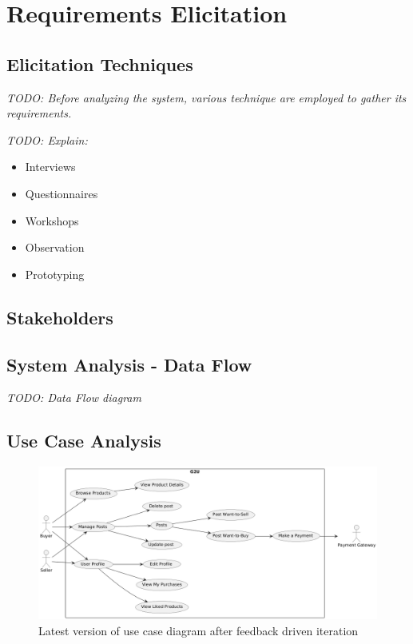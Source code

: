 %
%
\chapter{Requirements Elicitation}

\section{Elicitation Techniques}

\textit{TODO: Before analyzing the system, various technique are employed to gather its requirements.}

\textit{TODO: Explain:}

\begin{itemize}
	\item Interviews
	\item Questionnaires
	\item Workshops
	\item Observation
	\item Prototyping
\end{itemize}

\section{Stakeholders}

\section{System Analysis - Data Flow}

\textit{TODO: Data Flow diagram}

\section{Use Case Analysis}

\begin{figure}[!h]
	\centering
	\includegraphics[width=1\textwidth]{chapters/ch-03/00_usecase.png} %
	\caption{Latest version of use case diagram after feedback driven iteration}
	\label{fig:usecase} %
\end{figure}


